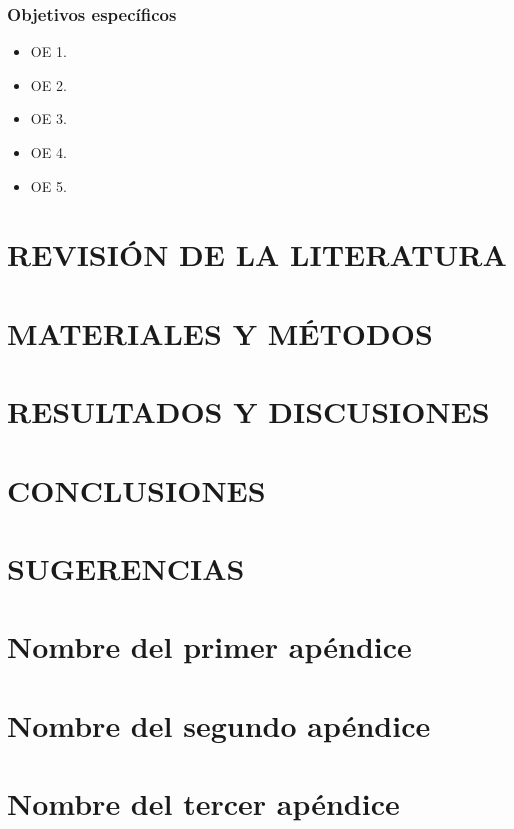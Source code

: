 \documentclass[11pt,oneside,a4paper]{book}
\begin{document}
\subsection{Objetivos específicos}
\begin{itemize}
    \item OE 1.
    \item OE 2.
    \item OE 3.
    \item OE 4.
    \item OE 5.
\end{itemize}

\chapter[CAPÍTULO II - REVISIÓN DE LA LITERATURA]{REVISIÓN DE LA LITERATURA}
\lipsum[4-10]


\chapter[CAPÍTULO III - MATERIALES Y MÉTODOS]{MATERIALES Y MÉTODOS}
\lipsum[4-10]

\protect
\chapter[CAPÍTULO IV - RESULTADOS Y DISCUSIONES]{RESULTADOS Y DISCUSIONES}

\lipsum[4-10]

\chapter[CAPÍTULO V - CONCLUSIONES]{CONCLUSIONES}
\lipsum[4-10]


\chapter[CAPÍTULO VI - SUGERENCIAS]{SUGERENCIAS}
\lipsum[1]


\newpage
\begin{appendices}
\chapter{Nombre del primer apéndice}

\chapter{Nombre del segundo apéndice}

\chapter{Nombre del tercer apéndice}

\end{appendices}


\newpage






\end{document}
